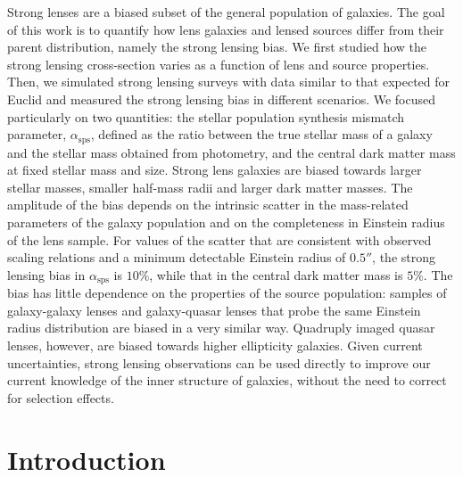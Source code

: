 \documentclass{aa}
\def\asps{\alpha_{\mathrm{sps}}}
\begin{document}
  \abstract
    {
Strong lenses are a biased subset of the general population of galaxies.
}
   {
The goal of this work is to quantify how lens galaxies and lensed sources differ from their parent distribution, namely the strong lensing bias.
} 
   {
We first studied how the strong lensing cross-section varies as a function of lens and source properties. 
Then, we simulated strong lensing surveys with data similar to that expected for Euclid and measured the strong lensing bias in different scenarios.
We focused particularly on two quantities: the stellar population synthesis mismatch parameter, $\asps$, defined as the ratio between the true stellar mass of a galaxy and the stellar mass obtained from photometry, and the central dark matter mass at fixed stellar mass and size.
}
   {
Strong lens galaxies are biased towards larger stellar masses, smaller half-mass radii and larger dark matter masses.
The amplitude of the bias depends on the intrinsic scatter in the mass-related parameters of the galaxy population and on the completeness in Einstein radius of the lens sample.
For values of the scatter that are consistent with observed scaling relations and a minimum detectable Einstein radius of $0.5''$, the strong lensing bias in $\asps$ is $10\%$, while that in the central dark matter mass is $5\%$.
The bias has little dependence on the properties of the source population: samples of galaxy-galaxy lenses and galaxy-quasar lenses that probe the same Einstein radius distribution are biased in a very similar way.
Quadruply imaged quasar lenses, however, are biased towards higher ellipticity galaxies.
}
   {
Given current uncertainties, strong lensing observations can be used directly to improve our current knowledge of the inner structure of galaxies, without the need to correct for selection effects.
}

   \maketitle
%

\section{Introduction}\label{sect:intro}
\end{document}
